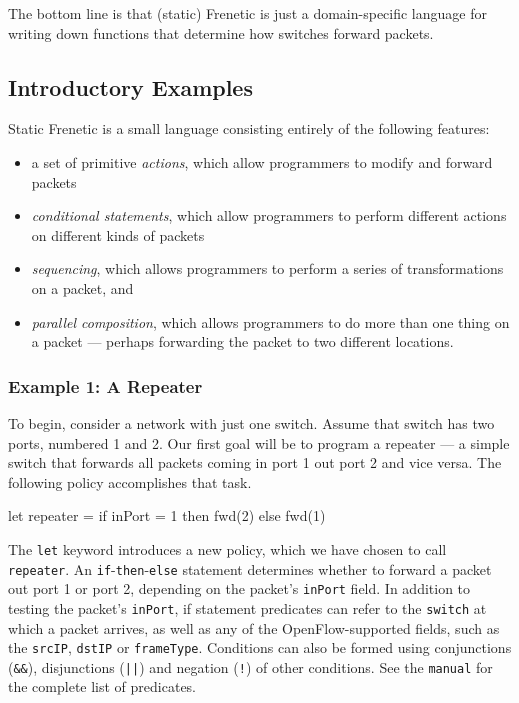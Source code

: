 \documentclass{article}
\newcommand{\code}[1]{\texttt{#1}}
\newcommand{\manualref}{\texttt{manual}}
\begin{document}
The bottom line is that (static) Frenetic is just a domain-specific
language for writing down functions that determine how switches
forward packets.

\subsection{Introductory Examples}

Static Frenetic is a small language consisting entirely of the following
features:

\begin{itemize}
\item a set of primitive \emph{actions}, which allow programmers to modify and 
forward packets
\item \emph{conditional statements}, which allow programmers to perform 
different actions on different kinds of packets
\item  \emph{sequencing}, which allows programmers to perform a series of
transformations on a packet, and
\item \emph{parallel composition}, which allows programmers to do more
than one thing on a packet --- perhaps forwarding the packet to two 
different locations.
\end{itemize}

\subsubsection{Example 1: A Repeater}

To begin, consider a network with just one switch.  Assume that switch 
has two ports, numbered 1 and 2.  Our first goal will be to program
a repeater --- a simple switch that forwards all packets coming in port 1
out port 2 and vice versa.  The following policy accomplishes that task.

\begin{progeg}
let repeater =
  if inPort = 1 then fwd(2)
  else fwd(1)
\end{progeg}

The \code{let} keyword introduces a new policy, which we have chosen to call 
\code{repeater}.  An \code{if}-\code{then}-\code{else} statement determines
whether to forward a packet out port 1 or port 2, depending on the packet's
\code{inPort} field.  In addition to testing the packet's \code{inPort}, 
if statement predicates can refer to
the \code{switch} 
at which a packet arrives, as well as any of the OpenFlow-supported
fields, such as the \code{srcIP}, \code{dstIP} or \code{frameType}.  
Conditions can also be formed using 
conjunctions (\code{\&\&}), disjunctions
(\code{||}) and negation (\code{!}) of other conditions.
See the \manualref{} for the complete list of predicates. 
\end{document}

